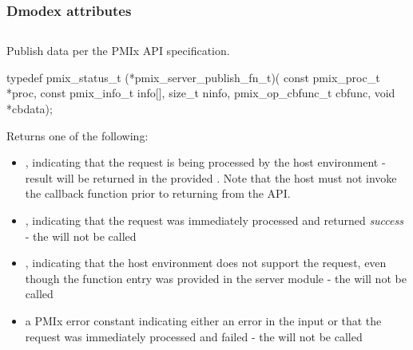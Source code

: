 \subsubsection{Dmodex attributes}

%


\subsection{}

\summary

Publish data per the PMIx API specification.

\format

\cspecificstart
\begin{codepar}
typedef pmix_status_t (*pmix_server_publish_fn_t)(
                             const pmix_proc_t *proc,
                             const pmix_info_t info[],
                             size_t ninfo,
                             pmix_op_cbfunc_t cbfunc,
                             void *cbdata);
\end{codepar}
\cspecificend

\begin{arglist}
\end{arglist}

Returns one of the following:

\begin{itemize}
    \item {}, indicating that the request is being processed by the host environment - result will be returned in the provided . Note that the host must not invoke the callback function prior to returning from the \ac{API}.
    \item {}, indicating that the request was immediately processed and returned \textit{success} - the  will not be called
    \item {}, indicating that the host environment does not support the request, even though the function entry was provided in the server module - the  will not be called
    \item a PMIx error constant indicating either an error in the input or that the request was immediately processed and failed - the  will not be called
\end{itemize}


